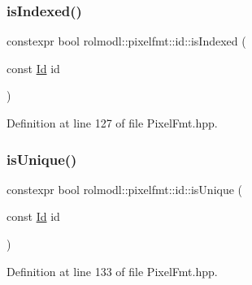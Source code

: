 \subsubsection{\texorpdfstring{isIndexed()}{isIndexed()}}
{\footnotesize\ttfamily constexpr bool rolmodl\+::pixelfmt\+::id\+::is\+Indexed (\begin{DoxyParamCaption}\item[{const \mbox{\hyperlink{namespacerolmodl_1_1pixelfmt_a96282713e4465ba9211c8fd3a702b52b}{Id}}}]{id }\end{DoxyParamCaption})\hspace{0.3cm}{\ttfamily [noexcept]}}



Definition at line 127 of file Pixel\+Fmt.\+hpp.

\mbox{\label{namespacerolmodl_1_1pixelfmt_1_1id_a478cbf9d8ceccbc4ebf8758d05ed2f2d}} 
\subsubsection{\texorpdfstring{isUnique()}{isUnique()}}
{\footnotesize\ttfamily constexpr bool rolmodl\+::pixelfmt\+::id\+::is\+Unique (\begin{DoxyParamCaption}\item[{const \mbox{\hyperlink{namespacerolmodl_1_1pixelfmt_a96282713e4465ba9211c8fd3a702b52b}{Id}}}]{id }\end{DoxyParamCaption})\hspace{0.3cm}{\ttfamily [noexcept]}}



Definition at line 133 of file Pixel\+Fmt.\+hpp.

